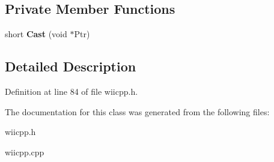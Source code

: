 \subsection*{Private Member Functions}
\begin{DoxyCompactItemize}
\item 
\hypertarget{class_c_nunchuk_buttons_a1fa701dac6b81d6bf8da7ed3b88ac0a1}{short {\bfseries Cast} (void $\ast$Ptr)}\label{class_c_nunchuk_buttons_a1fa701dac6b81d6bf8da7ed3b88ac0a1}

\end{DoxyCompactItemize}


\subsection{Detailed Description}


Definition at line 84 of file wiicpp.\-h.



The documentation for this class was generated from the following files\-:\begin{DoxyCompactItemize}
\item 
wiicpp.\-h\item 
wiicpp.\-cpp\end{DoxyCompactItemize}
